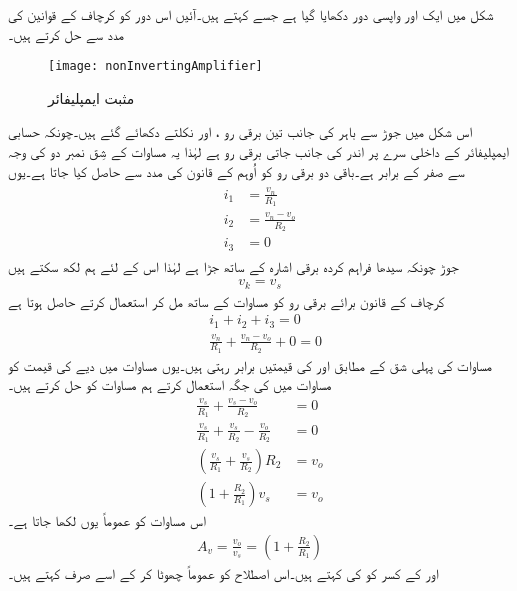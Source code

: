 	شکل   میں ایک اور واپسی دور دکھایا گیا ہے جسے 
  کہتے ہیں۔آئیں اس دور کو کرچاف کے قوانین کی مدد سے حل کرتے ہیں۔
\begin{figure}
\centering
\texttt{[image: nonInvertingAmplifier]}
\caption{مثبت ایمپلیفائر}
\label{شکل_مثبت_ایمپلیفائر}
\end{figure}
	اس شکل میں جوڑ  سے باہر کی جانب تین برقی رو ، اور نکلتے دکھائے گئے ہیں۔چونکہ حسابی ایمپلیفائر کے داخلی سرے پر اندر کی جانب جاتی برقی رو ہے لہٰذا یہ مساوات  کے شِق نمبر دو کی وجہ سے صفر کے برابر ہے۔باقی دو برقی رو کو اُوہم کے قانون کی مدد سے حاصل کیا جاتا ہے۔یوں
\begin{gather} 
\begin{aligned}\label{مساوات_مثبت_داخلی_سرے_پر_رو}
i_1 &=\frac{v_n}{R_1}\\
i_2&=\frac{v_n-v_o}{R_2}\\
i_3&=0
\end{aligned}
\end{gather}
جوڑ  چونکہ سیدھا فراہم کردہ برقی اشارہ  کے ساتھ جڑا ہے لہٰذا اس کے لئے ہم لکھ سکتے ہیں
\begin{align} \label{مساوات_مثبت_داخلی_دباو_اشارے_کے_برابر}
v_k = v_s
\end{align}
	کرچاف کے قانون برائے برقی رو کو مساوات   کے ساتھ مل کر استعمال کرتے حاصل ہوتا ہے
\begin{align} \label{مساوات_مثبت_افزائش_کا_حصول}
&i_1+i_2+i_3=0 \nonumber\\
&\frac{v_n}{R_1}+\frac{v_n-v_o}{R_2}+0=0
\end{align}
مساوات  کی پہلی شق کے مطابق   اور  کی قیمتیں برابر رہتی ہیں۔یوں مساوات   میں دیے  کی قیمت کو مساوات   میں  کی جگہ استعمال کرتے ہم مساوات   کو حل کرتے ہیں۔
\begin{align}
\frac{v_s}{R_1}+\frac{v_s-v_o}{R_2} &=0 \nonumber \\
\frac{v_s}{R_1}+\frac{v_s}{R_2}-\frac{v_o}{R_2}&=0 \nonumber \\
\left (  \frac{v_s}{R_1} +\frac{v_s}{R_2}\right ) R_2 &=v_o \nonumber \\
\left(1+\frac{R_2}{R_1} \right )v_s &=v_o
\end{align}
اس مساوات کو عموماً یوں لکھا جاتا ہے۔
\begin{align} \label{مساوات_مثبت_افزائش}
A_v=\frac{v_o}{v_s}=\left(1+\frac{R_2}{R_1} \right )
\end{align}
 اور  کے کسر کو  کی   کہتے ہیں۔اس اصطلاح کو عموماً چھوٹا کر کے اسے صرف  کہتے ہیں۔

